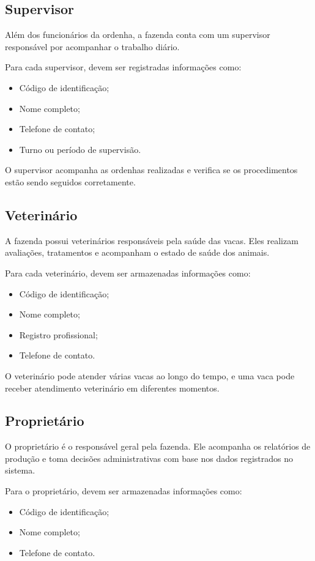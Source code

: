 \documentclass[12pt]{article}
\begin{document}
\subsection*{Supervisor}
Além dos funcionários da ordenha, a fazenda conta com um supervisor responsável
por acompanhar o trabalho diário.

Para cada supervisor, devem ser registradas informações como:
\begin{itemize}
    \item Código de identificação;
    \item Nome completo;
    \item Telefone de contato;
    \item Turno ou período de supervisão.
\end{itemize}

O supervisor acompanha as ordenhas realizadas e verifica se os procedimentos
estão sendo seguidos corretamente.
\subsection*{Veterinário}
A fazenda possui veterinários responsáveis pela saúde das vacas.
Eles realizam avaliações, tratamentos e acompanham o estado de saúde dos animais.

Para cada veterinário, devem ser armazenadas informações como:
\begin{itemize}
    \item Código de identificação;
    \item Nome completo;
    \item Registro profissional;
    \item Telefone de contato.
\end{itemize}

O veterinário pode atender várias vacas ao longo do tempo, e uma vaca pode
receber atendimento veterinário em diferentes momentos.
\subsection*{Proprietário}
O proprietário é o responsável geral pela fazenda.
Ele acompanha os relatórios de produção e toma decisões administrativas
com base nos dados registrados no sistema.

Para o proprietário, devem ser armazenadas informações como:
\begin{itemize}
    \item Código de identificação;
    \item Nome completo;
    \item Telefone de contato.
\end{itemize}
\end{document}

